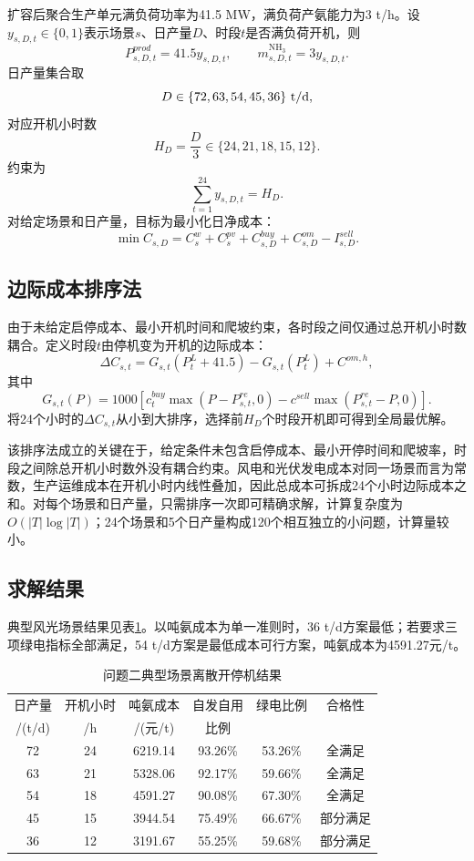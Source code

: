 \documentclass[UTF8,a4paper,12pt]{ctexart}
\newcommand{\NHthree}{\mathrm{NH_3}}
\begin{document}
扩容后聚合生产单元满负荷功率为41.5 MW，满负荷产氨能力为3 t/h。设$y_{s,D,t}\in\{0,1\}$表示场景$s$、日产量$D$、时段$t$是否满负荷开机，则
\[
P^{prod}_{s,D,t}=41.5y_{s,D,t},\qquad
m^{\NHthree}_{s,D,t}=3y_{s,D,t}.
\]
日产量集合取
\[
D\in\{72,63,54,45,36\}\ {\rm t/d},
\]
对应开机小时数
\[
H_D=\frac{D}{3}\in\{24,21,18,15,12\}.
\]
约束为
\[
\sum_{t=1}^{24}y_{s,D,t}=H_D.
\]
对给定场景和日产量，目标为最小化日净成本：
\[
\min C_{s,D}=C^w_s+C^{pv}_s+C^{buy}_{s,D}+C^{om}_{s,D}-I^{sell}_{s,D}.
\]

\subsection{边际成本排序法}

由于未给定启停成本、最小开机时间和爬坡约束，各时段之间仅通过总开机小时数耦合。定义时段$t$由停机变为开机的边际成本：
\[
\Delta C_{s,t}=G_{s,t}(P^L_t+41.5)-G_{s,t}(P^L_t)+C^{om,h},
\]
其中
\[
G_{s,t}(P)=1000\left[c^{buy}_t\max(P-P^{re}_{s,t},0)-c^{sell}\max(P^{re}_{s,t}-P,0)\right].
\]
将24个小时的$\Delta C_{s,t}$从小到大排序，选择前$H_D$个时段开机即可得到全局最优解。

该排序法成立的关键在于，给定条件未包含启停成本、最小开停时间和爬坡率，时段之间除总开机小时数外没有耦合约束。风电和光伏发电成本对同一场景而言为常数，生产运维成本在开机小时内线性叠加，因此总成本可拆成24个小时边际成本之和。对每个场景和日产量，只需排序一次即可精确求解，计算复杂度为$O(|T|\log|T|)$；24个场景和5个日产量构成120个相互独立的小问题，计算量较小。

\subsection{求解结果}

典型风光场景结果见表\ref{tab:q2_typical}。以吨氨成本为单一准则时，36 t/d方案最低；若要求三项绿电指标全部满足，54 t/d方案是最低成本可行方案，吨氨成本为4591.27元/t。

\begin{table}[H]
\centering
\caption{问题二典型场景离散开停机结果}
\label{tab:q2_typical}
\small
\begin{tabular}{c c c c c c}
\toprule
日产量 & 开机小时 & 吨氨成本 & 自发自用 & 绿电比例 & 合格性 \\
/(t/d) & /h & /(元/t) & 比例 &  &  \\
\midrule
72 & 24 & 6219.14 & 93.26\% & 53.26\% & 全满足 \\
63 & 21 & 5328.06 & 92.17\% & 59.66\% & 全满足 \\
54 & 18 & 4591.27 & 90.08\% & 67.30\% & 全满足 \\
45 & 15 & 3944.54 & 75.49\% & 66.67\% & 部分满足 \\
36 & 12 & 3191.67 & 55.25\% & 59.68\% & 部分满足 \\
\bottomrule
\end{tabular}
\end{table}
\end{document}
